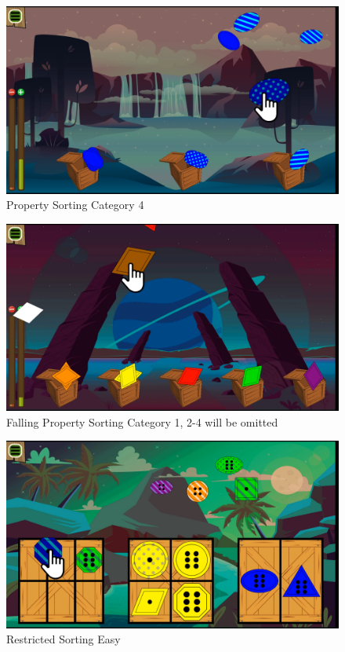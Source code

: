 \begin{figure}[H]
    \centering
    \includegraphics[width=1\textwidth]{figures/property4}
    \caption{Property Sorting Category 4}
    \label{fig:property4}
\end{figure}

\begin{figure}[H]
    \centering
    \includegraphics[width=1\textwidth]{figures/falling}
    \caption{Falling Property Sorting Category 1, 2-4 will be omitted}
    \label{fig:falling}
\end{figure}

\begin{figure}[H]
    \centering
    \includegraphics[width=1\textwidth]{figures/restricted1}
    \caption{Restricted Sorting Easy}
    \label{fig:restricted1}
\end{figure}

